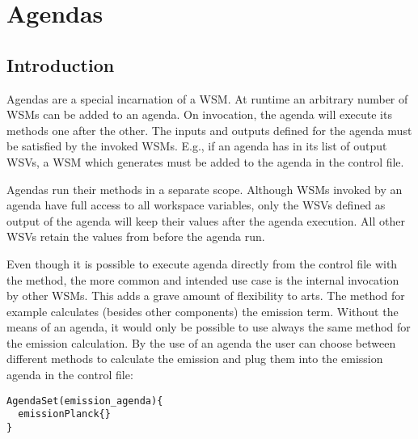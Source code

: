 \section{Agendas}
\label{sec:agendas:agendas}

\subsection{Introduction}
Agendas are a special incarnation of a WSM. At runtime an arbitrary
number of WSMs can be added to an agenda. On invocation, the agenda
will execute its methods one after the other. The inputs and outputs
defined for the agenda must be satisfied by the invoked WSMs. E.g., if
an agenda has  in its list of output WSVs, a WSM
which generates  must be added to the agenda in the
control file.

Agendas run their methods in a separate scope. Although WSMs invoked by
an agenda have full access to all workspace variables, only the WSVs
defined as output of the agenda will keep their values after the agenda
execution. All other WSVs retain the values from before the agenda
run.

Even though it is possible to execute agenda directly from the control
file with the  method, the more common and
intended use case is the internal invocation by other WSMs. This adds a
grave amount of flexibility to arts. The  method for
example calculates (besides other components) the emission term. Without
the means of an agenda, it would only be possible to use always the same
method for the emission calculation. By the use of an agenda the user
can choose between different methods to calculate the emission and plug
them into the emission agenda in the control file:

{\small
\begin{verbatim}
AgendaSet(emission_agenda){
  emissionPlanck{}
}
\end{verbatim}
}





